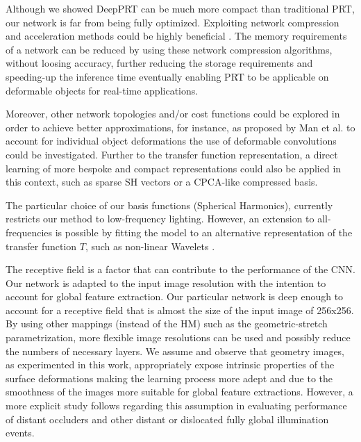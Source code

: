 Although we showed DeepPRT can be much more compact than traditional PRT, our network is far from being fully optimized. Exploiting network compression and acceleration methods could be highly beneficial \cite{Survey_NN_Compression, Deep_Compression}. The memory requirements of a network can be reduced by using these network compression algorithms, without loosing accuracy, further reducing the storage requirements and speeding-up the inference time eventually enabling PRT to be applicable on deformable objects for real-time applications.

Moreover, other network topologies and/or cost functions could be explored in order to achieve better approximations, for instance, as proposed by Man et al.  to account for individual object deformations the use of deformable convolutions \cite{DeformableCNN} could be investigated. Further to the transfer function representation, a direct learning of more bespoke and compact representations \cite{Sloan2018} could also be applied in this context, such as sparse SH vectors or a CPCA-like compressed basis.

The particular choice of our basis functions (Spherical Harmonics), currently restricts our method to low-frequency lighting. However, an extension to all-frequencies is possible by fitting the model to an alternative representation of the transfer function $T$, such as non-linear Wavelets \cite{AllFrequencyPRT}.

The receptive field is a factor that can contribute to the performance of the CNN. Our network is adapted to the input image resolution with the intention to account for global feature extraction. Our particular network is deep enough to account for a receptive field that is almost the size of the input image of 256x256. By using other mappings (instead of the HM) such as the geometric-stretch parametrization, more flexible image resolutions can be used and possibly reduce the numbers of necessary layers. We assume and observe that geometry images, as experimented in this work, appropriately expose intrinsic properties of the surface deformations making the learning process more adept and due to the smoothness of the images more suitable for global feature extractions. However, a more explicit study follows regarding this assumption in evaluating performance of distant occluders and other distant or dislocated fully global illumination events.

